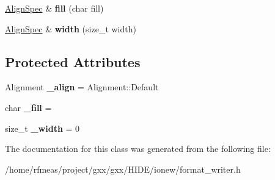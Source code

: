 \begin{DoxyCompactItemize}
\item 
\hyperlink{classgxx_1_1io_1_1AlignSpec}{Align\+Spec} \& {\bfseries fill} (char fill)\hypertarget{classgxx_1_1io_1_1AlignSpec_a6f82e3aab453ce2ea5d93e37da6f3b01}{}\label{classgxx_1_1io_1_1AlignSpec_a6f82e3aab453ce2ea5d93e37da6f3b01}

\item 
\hyperlink{classgxx_1_1io_1_1AlignSpec}{Align\+Spec} \& {\bfseries width} (size\+\_\+t width)\hypertarget{classgxx_1_1io_1_1AlignSpec_a0cd7069f31fe0c417633f96c527b242b}{}\label{classgxx_1_1io_1_1AlignSpec_a0cd7069f31fe0c417633f96c527b242b}

\end{DoxyCompactItemize}
\subsection*{Protected Attributes}
\begin{DoxyCompactItemize}
\item 
Alignment {\bfseries \+\_\+align} = Alignment\+::\+Default\hypertarget{classgxx_1_1io_1_1AlignSpec_a2e9dd2412a1313263756ae2e8c6a839b}{}\label{classgxx_1_1io_1_1AlignSpec_a2e9dd2412a1313263756ae2e8c6a839b}

\item 
char {\bfseries \+\_\+fill} = \textquotesingle{} \textquotesingle{}\hypertarget{classgxx_1_1io_1_1AlignSpec_a534478199c8d086a8dffc381d98c075a}{}\label{classgxx_1_1io_1_1AlignSpec_a534478199c8d086a8dffc381d98c075a}

\item 
size\+\_\+t {\bfseries \+\_\+width} = 0\hypertarget{classgxx_1_1io_1_1AlignSpec_ab1ccba3dd4de2efcfa7e21a9f0a2a894}{}\label{classgxx_1_1io_1_1AlignSpec_ab1ccba3dd4de2efcfa7e21a9f0a2a894}

\end{DoxyCompactItemize}


The documentation for this class was generated from the following file\+:\begin{DoxyCompactItemize}
\item 
/home/rfmeas/project/gxx/gxx/\+H\+I\+D\+E/ionew/format\+\_\+writer.\+h\end{DoxyCompactItemize}
